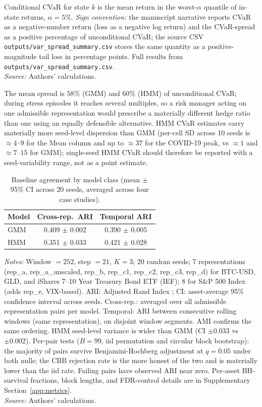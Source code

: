 \documentclass[preprint,12pt,authoryear]{elsarticle}
\newcommand{\SPX}{S\&P 500 Index}
\newcommand{\IEF}{iShares 7--10 Year Treasury Bond ETF (IEF)}
\begin{document}
\begin{table}[!htbp]
Conditional CVaR for state $k$ is the mean return in the worst-$\alpha$ quantile of in-state returns, $\alpha=5\%$.
\emph{Sign convention:} the manuscript narrative reports CVaR as a negative-number return (loss as a negative log return) and the CVaR-spread as a positive percentage of unconditional CVaR; the source CSV \texttt{outputs/var\_spread\_summary.csv} stores the same quantity as a positive-magnitude tail loss in percentage points.
Full results from \texttt{outputs/var\_spread\_summary.csv}.\\
\textit{Source:} Authors' calculations.
\end{table}

The mean spread is $58\%$ (GMM) and $60\%$ (HMM) of unconditional CVaR; during stress episodes it reaches several multiples, so a risk manager acting on one admissible representation would prescribe a materially different hedge ratio than one using an equally defensible alternative. HMM CVaR estimates carry materially more seed-level dispersion than GMM (per-cell SD across 10 seeds is $\approx 4$--$9$ for the Mean column and up to $\approx 37$ for the COVID-19 peak, vs $\approx 1$ and $\approx 7$--$15$ for GMM); single-seed HMM CVaR should therefore be reported with a seed-variability range, not as a point estimate.

\begin{table}[!htbp]
\centering
\small
\setlength{\tabcolsep}{5pt}
\caption{Baseline agreement by model class (mean $\pm$ 95\% CI across 20 seeds, averaged across four case studies).}
\label{tab:baseline}
\begin{tabular}{lcc}
\toprule
Model & Cross-rep.\ ARI & Temporal ARI \\
\midrule
GMM & 0.409 $\pm$ 0.002 & 0.390 $\pm$ 0.005 \\
HMM & 0.351 $\pm$ 0.033 & 0.421 $\pm$ 0.028 \\
\bottomrule
\end{tabular}
\medskip
\footnotesize
\textit{Notes:} Window $=252$, step $=21$, $K=3$; 20 random seeds; 7 representations (rep\_a, rep\_a\_unscaled, rep\_b, rep\_c1, rep\_c2, rep\_c3, rep\_d) for BTC-USD, GLD, and \IEF{}; 8 for \SPX{} (adds rep\_e, VIX-based). ARI: Adjusted Rand Index \citep{HubertArabie1985}; CI: asset-average 95\% confidence interval across seeds. Cross-rep.: averaged over all admissible representation pairs per model. Temporal: ARI between consecutive rolling windows (same representation), on disjoint window segments. AMI \citep{VinhEppsBailey2010} confirms the same ordering. HMM seed-level variance is wider than GMM (CI $\pm 0.033$ vs $\pm 0.002$). Per-pair tests ($B=99$, iid permutation and circular block bootstrap): the majority of pairs survive Benjamini-Hochberg adjustment at $q=0.05$ under both nulls; the CBB rejection rate is the more honest of the two and is materially lower than the iid rate. Failing pairs have observed ARI near zero. Per-asset BH-survival fractions, block lengths, and FDR-control details are in Supplementary Section~\ref{app:metrics}. \\
\textit{Source:} Authors' calculations.
\end{table}
\end{document}
